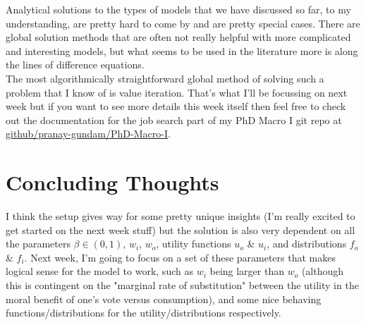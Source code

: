 \documentclass[11pt,english]{article}
\begin{document}
\noindent Analytical solutions to the types of models that we have discussed so far, to my understanding, are pretty hard to come by and are pretty special cases. There are global solution methods that are often not really helpful with more complicated and interesting models, but what seems to be used in the literature more is along the lines of difference equations.\\

\noindent The most algorithmically straightforward global method of solving such a problem that I know of is value iteration. That's what I'll be focussing on next week but if you want to see more details this week itself then feel free to check out the documentation for the job search part of my PhD Macro I git repo at \href{https://github.com/pranay-gundam/PhDMacro-I}{github/pranay-gundam/PhD-Macro-I}.

\section*{Concluding Thoughts}

I think the setup gives way for some pretty unique insights (I'm really excited to get started on the next week stuff) but the solution is also very dependent on all the parameters $\beta \in (0,1)$, $w_i$, $w_o$, utility functions $u_o$ \& $u_i$, and distributions $f_o$ \& $f_i$. Next week, I'm going to focus on a set of these parameters that makes logical sense for the model to work, such as $w_i$ being larger than $w_o$ (although this is contingent on the "marginal rate of substitution" between the utility in the moral benefit of one's vote versus consumption), and some nice behaving functions/distributions for the utility/distributions respectively.
\end{document}
